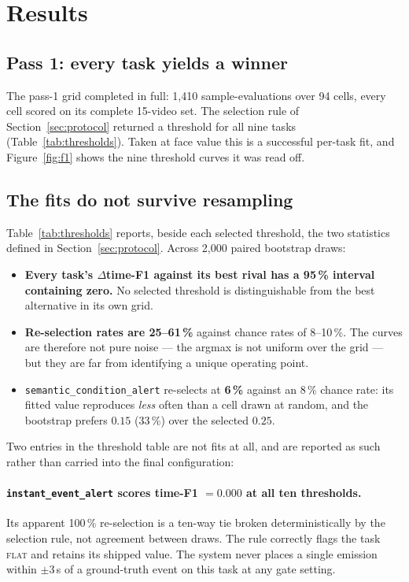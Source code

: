\section{Results}
\label{sec:results}

\subsection{Pass 1: every task yields a winner}

The pass-1 grid completed in full: 1{,}410 sample-evaluations over 94 cells, every
cell scored on its complete 15-video set. The selection rule of
Section~\ref{sec:protocol} returned a threshold for all nine tasks
(Table~\ref{tab:thresholds}). Taken at face value this is a successful per-task
fit, and Figure~\ref{fig:f1} shows the nine threshold curves it was read off.

\subsection{The fits do not survive resampling}

Table~\ref{tab:thresholds} reports, beside each selected threshold, the two
statistics defined in Section~\ref{sec:protocol}. Across 2{,}000 paired bootstrap
draws:

\begin{itemize}
\item \textbf{Every task's $\Delta$time-F1 against its best rival has a 95\,\%
      interval containing zero.} No selected threshold is distinguishable from the
      best alternative in its own grid.
\item \textbf{Re-selection rates are 25--61\,\%} against chance rates of 8--10\,\%.
      The curves are therefore not pure noise --- the argmax is not uniform over
      the grid --- but they are far from identifying a unique operating point.
\item \texttt{semantic\_condition\_alert} re-selects at \textbf{6\,\%} against an
      8\,\% chance rate: its fitted value reproduces \emph{less} often than a cell
      drawn at random, and the bootstrap prefers $0.15$ (33\,\%) over the selected
      $0.25$.
\end{itemize}

Two entries in the threshold table are not fits at all, and are reported as such
rather than carried into the final configuration:

\paragraph{\texttt{instant\_event\_alert} scores time-F1 $=0.000$ at all ten
thresholds.} Its apparent 100\,\% re-selection is a ten-way tie broken
deterministically by the selection rule, not agreement between draws. The rule
correctly flags the task \textsc{flat} and retains its shipped value. The system
never places a single emission within $\pm 3$\,s of a ground-truth event on this
task at any gate setting.

